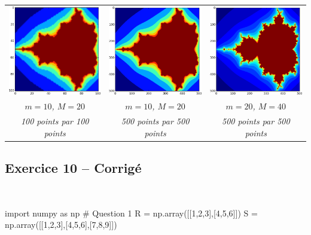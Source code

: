 \documentclass[10pt,fleqn]{article} %
\begin{document}
\begin{center}
\begin{tabular}{ccc}
\includegraphics[width=.3\linewidth]{programmes/Exercice_09/10_20_100} &
\includegraphics[width=.3\linewidth]{programmes/Exercice_09/10_20_500} & 
\includegraphics[width=.3\linewidth]{programmes/Exercice_09/20_40_500} \\
\textit{$m=10$, $M=20$} &
\textit{$m=10$, $M=20$} &
\textit{$m=20$, $M=40$} \\
\textit{100 points par 100 points} & 
\textit{500 points par 500 points} & 
\textit{500 points par 500 points} \\
\end{tabular}
\end{center}



\subsection*{Exercice 10 -- Corrigé}
\begin{corrige}
$\quad$
\begin{python}
import numpy as np
# Question 1
R = np.array([[1,2,3],[4,5,6]])
S = np.array([[1,2,3],[4,5,6],[7,8,9]])
\end{python}
\end{corrige}
\end{document}
